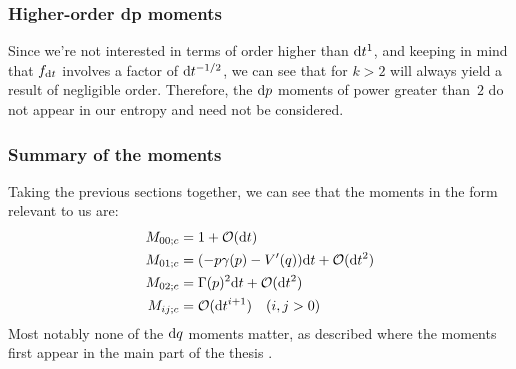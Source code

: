 \subsubsection{Higher-order dp moments}

Since we're not interested in terms of order higher than \(\mathrm{d} t^1\), and keeping in mind that \(f_{\mathrm{d} t}\) involves a factor of \(\mathrm{d} t^{-1/2}\), we can see that for \(k>2\)  will always yield a result of negligible order. Therefore, the \(\mathrm{d} p\) moments of power greater than~\(2\) do not appear in our entropy and need not be considered.

\subsubsection{Summary of the moments}

Taking the previous sections together, we can see that the moments in the form relevant to us are:
%
\begin{align}
	M_{00;c} &= 1 + \mathcal{O}(\mathrm{d} t) \\
	M_{01;c} &= (-p\gamma(p) - V'(q)) \mathrm{d} t + \mathcal{O}(\mathrm{d} t^2) \\
	M_{02;c} &= \Gamma(p)^2 \mathrm{d} t + \mathcal{O}(\mathrm{d} t^2) \\
	M_{ij;c} &= \mathcal{O}(\mathrm{d} t^{i+1}) \quad (i,j > 0)
\end{align}
%
Most notably none of the \(\mathrm{d} q\) moments matter, as described where the moments first appear in the main part of the thesis .
